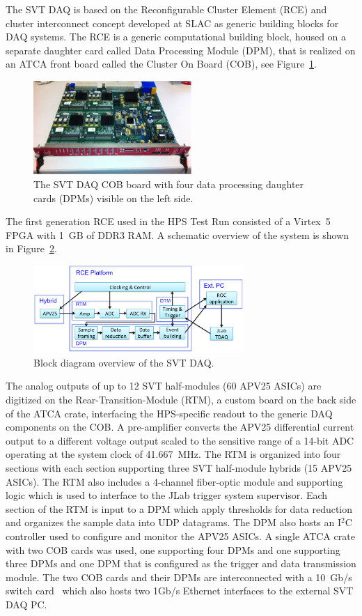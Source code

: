 \documentclass[final,3p,times,twocolumn]{elsarticle}
\begin{document}
The SVT DAQ is based on the Reconfigurable Cluster Element (RCE) and cluster 
interconnect concept developed at SLAC as generic building blocks for DAQ systems. 
The RCE is a generic computational building block, housed on a separate daughter card called 
Data Processing Module (DPM), that is realized on an ATCA front board called the Cluster On Board 
(COB), see Figure~\ref{fig:cob}.
 \begin{figure}[]
\begin{center}
\includegraphics[width=6cm]{svt_daq_module}
\caption{\small The SVT DAQ COB board with four data processing daughter cards (DPMs) visible on the left side.
\label{fig:cob}}
\end{center}
\end{figure}
The first generation RCE used in the HPS Test Run consisted of a Virtex~5 FPGA with 1~GB of DDR3 RAM. 
A schematic overview of the system is shown in Figure~\ref{fig:svtdaq}. 
 \begin{figure}[]
\begin{center}
\includegraphics[width=8cm]{svt-daq-sketch}
\caption{\small Block diagram overview of the SVT DAQ.
\label{fig:svtdaq}}
\end{center}
\end{figure}
The analog outputs of up to 12 SVT half-modules (60 APV25 ASICs) are digitized on the 
Rear-Transition-Module (RTM), a custom board on the back side of the ATCA crate, interfacing the 
HPS-specific readout to the generic DAQ components on the COB. A pre-amplifier converts the APV25 
differential current output to a different voltage output scaled to the sensitive range of a 14-bit ADC 
operating at the system clock of 41.667~MHz. The RTM is organized 
into four sections with each section supporting three SVT half-module hybrids (15 APV25 ASICs). The 
RTM also includes a 4-channel fiber-optic module and supporting logic which is used to interface 
to the JLab trigger system supervisor. Each section of the RTM is input to a DPM which apply 
thresholds for data reduction and organizes the sample data into UDP datagrams. The DPM also hosts 
an I$^{2}$C controller used to configure and monitor the APV25 ASICs. A single ATCA crate with two 
COB cards was used, one supporting four DPMs and one supporting three DPMs and one DPM that is 
configured as the trigger and data transmission module. The two COB cards and their DPMs are 
interconnected with a 10~Gb/s switch card~\cite{Larsen:2011zb} which also hosts two 1Gb/s Ethernet 
interfaces to the external SVT DAQ PC.  
\end{document}

